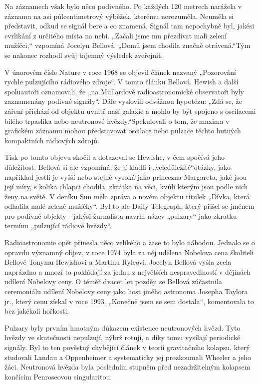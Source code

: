   Na záznamech však bylo něco podivného. Po každých 120 metrech narážela v záznamu na asi
  půlcentimetrový výběžek, kterému nerozuměla. Neuměla si představit, odkud se signál bere a co
  znamená. Signál tam nepochybně byl, jakési cvrlikání z určitého místa na nebi. „Začali jsme mu
  přezdívat malí zelení mužíčci,“ vzpomíná Jocelyn Bellová. „Domů jsem chodila značně otrávená.“Tým
  se nakonec rozhodl svůj tajemný výsledek zveřejnit. 

  V únorovém čísle Nature v roce 1968 se objevil článek nazvaný „Pozorování rychle pulzujícího
  rádiového zdroje“. V tomto článku Bellová, Hewish a další spoluautoři oznamovali, že „na
  Mullardově radioastronomické observatoři byly zaznamenány podivné signály“. Dále vyslovili
  odvážnou hypotézu: „Zdá se, že záření přichází od objektu uvnitř naší galaxie a mohlo by být
  spojeno s oscilacemi bílého trpaslíka nebo neutronové hvězdy.“Spekulovali o tom, že maxima v
  grafickém záznamu mohou představovat oscilace nebo pulzace těchto hutných kompaktních rádiových
  zdrojů. 

  Tisk po tomto objevu skočil a dotazoval se Hewishe, v čem spočívá jeho důležitost. Bellová si ale
  vzpomíná, že jí kladli i „veledůležité“otázky, jako například jestli je vyšší nebo stejně vysoká
  jako princezna Margareta, jaké jsou její míry, s kolika chlapci chodila, zkrátka na věci, kvůli
  kterým jsou podle nich ženy na světě. V deníku Sun měla zpráva o novém objektu titulek „Dívka,
  která odhalila malé zelené mužíčky“. Byl to ale Daily Telegraph, který přišel se jménem pro
  podivné objekty - jakýsi žurnalista navrhl název „pulzary“ jako zkratku termínu „pulzující rádiové
  hvězdy“. 

  Radioastronomie opět přinesla něco velikého a zase to bylo náhodou. Jednalo se o opravdu významný
  objev, v roce 1974 byla za něj udělena Nobelova cena školiteli Bellové Tonymu Hewishovi a Martinu
  Ryleovi. Jocelyn Bellová vyšla zcela naprázdno a mnozí to pokládají za jednu z největších
  nespravedlností v dějinách udílení Nobelovy ceny. O téměř dvacet let později se Bellová zúčastnila
  ceremoniálu udílení Nobelovy ceny jako host jiného astronoma Josepha Taylora jr., který cenu
  získal v roce 1993. „Konečně jsem se sem dostala“, komentovala to bez jakékoli hořkosti. 

  Pulzary byly prvním hmotným důkazem existence neutronových hvězd. Tyto hvězdy ve skutečnosti
  nepulzují, nýbrž rotují, a díky tomu vysílají periodické signály. Byl to ten pověstný chybějící
  článek v teorii gravitačního kolapsu, který studovali Landau a Oppenheimer a systematicky jej
  prozkoumali Wheeler a jeho žáci. Neutronová hvězda byla posledním stupněm před nezadržitelným
  kolapsem končícím Penroseovou singularitou. 

